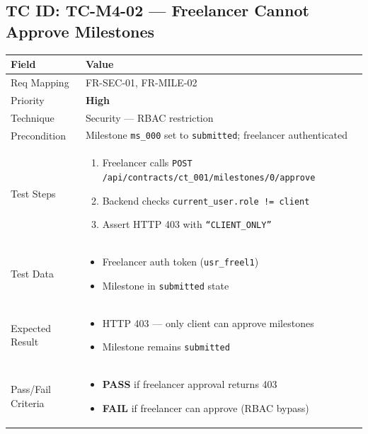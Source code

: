 \documentclass[12pt,a4paper]{article}
\newcommand{\sevhigh}{\textcolor{severityhigh}{\textbf{High}}}
\newcommand{\passresult}{\textcolor{passgreen}{\textbf{PASS}}}
\newcommand{\failresult}{\textcolor{failred}{\textbf{FAIL}}}
\begin{document}
\vspace{0.8cm}

\subsection{TC ID: TC-M4-02 --- Freelancer Cannot Approve Milestones}

\begin{tabular}{|p{}|p{}|}
\hline
\rowcolor{lightblue} \textbf{Field} & \textbf{Value} \\
\hline
Req Mapping & FR-SEC-01, FR-MILE-02 \\
\hline
Priority & \sevhigh \\
\hline
Technique & Security --- RBAC restriction \\
\hline
Precondition & Milestone \texttt{ms\_000} set to \texttt{submitted}; freelancer authenticated \\
\hline
Test Steps &
\begin{enumerate}[nosep, leftmargin=*]
  \item Freelancer calls \texttt{POST /api/contracts/ct\_001/milestones/0/approve}
  \item Backend checks \texttt{current\_user.role != client}
  \item Assert HTTP 403 with \texttt{``CLIENT\_ONLY''}
\end{enumerate} \\
\hline
Test Data &
\begin{itemize}[nosep, leftmargin=*]
  \item Freelancer auth token (\texttt{usr\_freel1})
  \item Milestone in \texttt{submitted} state
\end{itemize} \\
\hline
Expected Result &
\begin{itemize}[nosep, leftmargin=*]
  \item HTTP 403 --- only client can approve milestones
  \item Milestone remains \texttt{submitted}
\end{itemize} \\
\hline
Pass/Fail Criteria &
\begin{itemize}[nosep, leftmargin=*]
  \item \passresult{} if freelancer approval returns 403
  \item \failresult{} if freelancer can approve (RBAC bypass)
\end{itemize} \\
\hline
\end{tabular}
\end{document}
